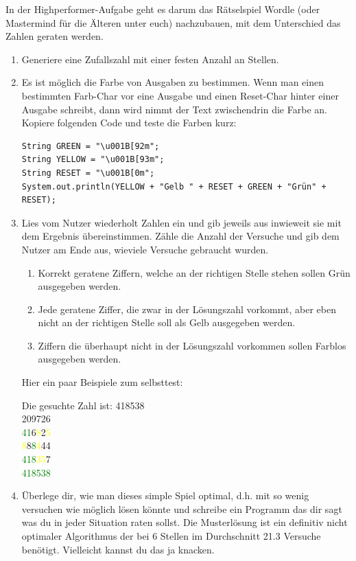 \documentclass{../../sheet}
\begin{document}
\newpage
{}
In der Highperformer-Aufgabe geht es darum das Rätselspiel Wordle (oder Mastermind für die Älteren unter euch) nachzubauen, mit dem Unterschied das Zahlen geraten werden. 

\begin{enumerate}
    \item Generiere eine Zufallszahl mit einer festen Anzahl an Stellen.
    \item Es ist möglich die Farbe von Ausgaben zu bestimmen. Wenn man einen bestimmten Farb-Char vor eine Ausgabe und einen Reset-Char hinter einer Ausgabe schreibt, dann wird nimmt der Text zwischendrin die Farbe an. Kopiere folgenden Code und teste die Farben kurz:
\begin{verbatim}
String GREEN = "\u001B[92m";
String YELLOW = "\u001B[93m";
String RESET = "\u001B[0m";
System.out.println(YELLOW + "Gelb " + RESET + GREEN + "Grün" + RESET);
\end{verbatim}
    \item Lies vom Nutzer wiederholt Zahlen ein und gib jeweils aus inwieweit sie mit dem Ergebnis übereinstimmen. Zähle die Anzahl der Versuche und gib dem Nutzer am Ende aus, wieviele Versuche gebraucht wurden.
    \begin{enumerate}
        \item Korrekt geratene Ziffern, welche an der richtigen Stelle stehen sollen Grün ausgegeben werden.
        \item Jede geratene Ziffer, die zwar in der Lösungszahl vorkommt, aber eben nicht an der richtigen Stelle soll als Gelb ausgegeben werden. 
        \item Ziffern die überhaupt nicht in der Lösungszahl vorkommen sollen Farblos ausgegeben werden.
    \end{enumerate}
    Hier ein paar Beispiele zum selbsttest:
\begin{ausgabe}
Die gesuchte Zahl ist: 418538\\
209726\\
\textcolor{green}{41}6\textcolor{yellow}{8}2\textcolor{yellow}{5}\\
\textcolor{yellow}{8}8\textcolor{green}{8}\textcolor{yellow}{4}44\\
\textcolor{green}{418}\textcolor{yellow}{35}7\\
\textcolor{green}{418538}
\end{ausgabe}
    \item Überlege dir, wie man dieses simple Spiel optimal, d.h. mit so wenig versuchen wie möglich lösen könnte und schreibe ein Programm das dir sagt was du in jeder Situation raten sollst. Die Musterlösung ist ein definitiv nicht optimaler Algorithmus der bei 6 Stellen im Durchschnitt 21.3 Versuche benötigt. Vielleicht kannst du das ja knacken.
\end{enumerate}
\end{document}
